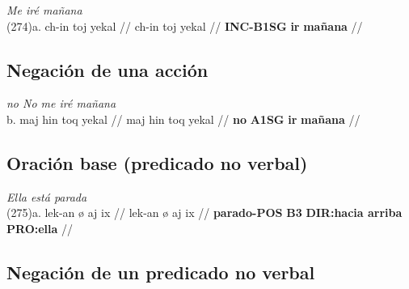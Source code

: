 \documentclass{article}%
\begin{document}
%
\par\medskip%
\ex
\textit{Me iré mañana} \\
\begingl
\gla (274)a. ch-in toj yekal //
\glb ch-in toj yekal //
\glc \textbf{INC-}\textbf{B1SG} \textbf{ir} \textbf{mañana} //
\endgl
\xe
%
\medskip%
\subsection{Negación de una acción}%
\label{subsec:Negacindeunaaccin}%

%
\par\medskip%
\ex
\textit{no No me iré mañana} \\
\begingl
\gla b. maj hin toq yekal //
\glb maj hin toq yekal //
\glc \textbf{no} \textbf{A1SG} \textbf{ir} \textbf{mañana} //
\endgl
\xe
%
\medskip%
\subsection{Oración base (predicado no verbal)}%
\label{subsec:Oracinbase(predicadonoverbal)}%

%
\par\medskip%
\ex
\textit{Ella está parada} \\
\begingl
\gla (275)a. lek-an ø aj ix //
\glb lek-an ø aj ix //
\glc \textbf{parado-}\textbf{POS} \textbf{B3} \textbf{DIR:hacia arriba} \textbf{PRO:ella} //
\endgl
\xe
%
\medskip%
\subsection{Negación de un predicado no verbal}%
\label{subsec:Negacindeunpredicadonoverbal}%

%
\end{document}
